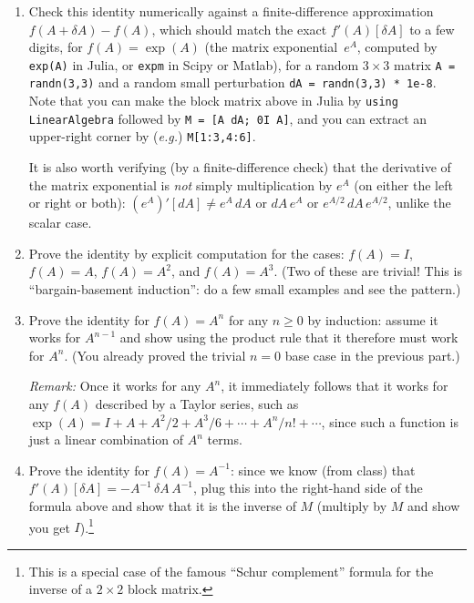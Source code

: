 \documentclass[10pt,oneside]{article}
\begin{document}
\begin{enumerate}

\item Check this identity numerically against a finite-difference approximation $f(A+\delta A) - f(A)$, which should match the exact $f'(A)[\delta A]$ to a few digits, for $f(A) = \exp(A)$ (the matrix exponential~$e^A$, computed by \texttt{exp(A)} in Julia, or \texttt{expm} in Scipy or Matlab), for a random $3 \times 3$ matrix \texttt{A = randn(3,3)} and a random small perturbation \texttt{dA = randn(3,3) * 1e-8}. Note that you can make the block matrix above in Julia by \texttt{using LinearAlgebra} followed by \texttt{M = [A dA; 0I A]}, and you can extract an upper-right corner by (\textit{e.g.}) \texttt{M[1:3,4:6]}.

It is also worth verifying (by a finite-difference check) that the derivative of the matrix exponential is \emph{not} simply multiplication by $e^A$ (on either the left or right or both): $(e^A)'[dA] \ne e^A \, dA$ or $dA \, e^A$ or $e^{A/2} \, dA \, e^{A/2}$, unlike the scalar case.

\item Prove the identity by explicit computation for the cases: $f(A) = I$, $f(A) = A$, $f(A) = A^2$, and $f(A) = A^3$.  (Two of these are trivial!  This is ``bargain-basement induction'': do a few small examples and see the pattern.)

\item Prove the identity for $f(A) = A^n$ for any $n \ge 0$ by induction: assume it works for $A^{n-1}$ and show using the product rule that it therefore must work for $A^n$.  (You already proved the trivial $n=0$ base case in the previous part.)

\emph{Remark:} 
Once it works for any $A^n$, it immediately follows that it works for any $f(A)$ described by a Taylor series, such as $\exp(A) = I + A + A^2/2 + A^3/6 + \cdots + A^n / n! + \cdots$, since such a function is just a linear combination of $A^n$ terms.

\item Prove the identity for $f(A) = A^{-1}$: since we know (from class) that $f'(A)[\delta A] = -A^{-1} \, \delta A \, A^{-1}$, plug this into the right-hand side of the formula above and show that it is the inverse of $M$ (multiply by $M$ and show you get $I$).\footnote{This is a special case of the famous ``Schur complement'' formula for the inverse of a $2 \times 2$ block matrix.}

\end{enumerate}

 
\end{document}
